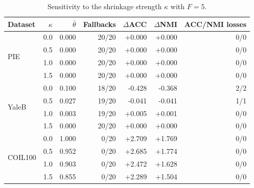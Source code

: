 \begin{table}[t]
\centering
\caption{Sensitivity to the shrinkage strength $\kappa$ with $F=5$.}\label{tab:kappa_sensitivity}
\small
\begin{tabular}{lrrrrrr}
\toprule
Dataset & $\kappa$ & $\bar\theta$ & Fallbacks & $\Delta$ACC & $\Delta$NMI & ACC/NMI losses \\
\midrule
\multirow{4}{*}{PIE} & 0.0 & 0.000 & 20/20 & +0.000 & +0.000 & 0/0 \\
 & 0.5 & 0.000 & 20/20 & +0.000 & +0.000 & 0/0 \\
 & 1.0 & 0.000 & 20/20 & +0.000 & +0.000 & 0/0 \\
 & 1.5 & 0.000 & 20/20 & +0.000 & +0.000 & 0/0 \\
\midrule
\multirow{4}{*}{YaleB} & 0.0 & 0.100 & 18/20 & -0.428 & -0.368 & 2/2 \\
 & 0.5 & 0.027 & 19/20 & -0.041 & -0.041 & 1/1 \\
 & 1.0 & 0.003 & 19/20 & +0.005 & +0.001 & 0/0 \\
 & 1.5 & 0.000 & 20/20 & +0.000 & +0.000 & 0/0 \\
\midrule
\multirow{4}{*}{COIL100} & 0.0 & 1.000 & 0/20 & +2.709 & +1.769 & 0/0 \\
 & 0.5 & 0.952 & 0/20 & +2.685 & +1.774 & 0/0 \\
 & 1.0 & 0.903 & 0/20 & +2.472 & +1.628 & 0/0 \\
 & 1.5 & 0.855 & 0/20 & +2.289 & +1.504 & 0/0 \\
\bottomrule
\end{tabular}
\end{table}
